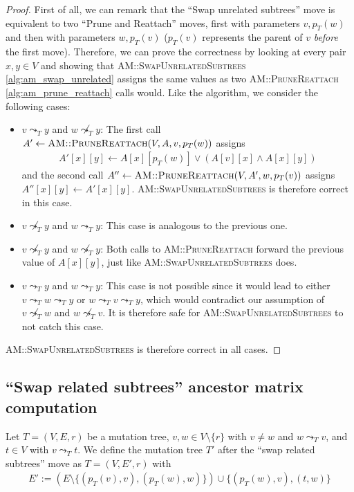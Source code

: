 \begin{proof}
    First of all, we can remark that the ``Swap unrelated subtrees'' move is equivalent to two ``Prune and Reattach'' moves, first with parameters $v, p_T(w)$ and then with parameters $w, p_T(v)$ ($p_T(v)$ represents the parent of $v$ \textit{before} the first move). Therefore, we can prove the correctness by looking at every pair $x,y \in V$ and showing that \textsc{AM::SwapUnrelatedSubtrees} \ref{alg:am_swap_unrelated} assigns the same values as two \textsc{AM::PruneReattach} \ref{alg:am_prune_reattach} calls would. Like the algorithm, we consider the following cases:
    \begin{itemize}
        \item $v \leadsto_T y$ and $w \not\leadsto_T y$: The first call $A' \leftarrow \textsc{AM::PruneReattach}(V, A, v, p_T(w))$ assigns 
        \begin{align*}
            A'[x][y] \leftarrow A[x][p_T(w)] \vee (A[v][x] \wedge A[x][y])
        \end{align*}
        and the second call $A'' \leftarrow \textsc{AM::PruneReattach}(V, A', w, p_T(v))$ assigns $A''[x][y] \leftarrow A'[x][y]$. \textsc{AM::SwapUnrelatedSubtrees} is therefore correct in this case.
        \item $v \not\leadsto_T y$ and $w \leadsto_T y$: This case is analogous to the previous one.
        \item $v \not\leadsto_T y$ and $w \not\leadsto_T y$: Both calls to \textsc{AM::PruneReattach} forward the previous value of $A[x][y]$, just like \textsc{AM::SwapUnrelatedSubtrees} does.
        \item $v \leadsto_T y$ and $w \leadsto_T y$: This case is not possible since it would lead to either $v \leadsto_T w \leadsto_T y$ or $w \leadsto_T v \leadsto_T y$, which would contradict our assumption of $v \not\leadsto_T w$ and $w \not\leadsto_T v$. It is therefore safe for \textsc{AM::SwapUnrelatedSubtrees} to not catch this case.
    \end{itemize}
    \textsc{AM::SwapUnrelatedSubtrees} is therefore correct in all cases.
\end{proof}

\subsection{``Swap related subtrees'' ancestor matrix computation}

\begin{definition}
    \label{def:swap_related_subtrees}
    Let $T = (V, E, r)$ be a mutation tree, $v, w \in V \setminus \{r\}$ with $v \neq w$ and $w \leadsto_T v$, and $t \in V$ with $v \leadsto_T t$. We define the mutation tree $T'$ after the ``swap related subtrees'' move as $T = (V, E', r)$ with
    \begin{align*}
        E' := (E \setminus \{(p_T(v), v), (p_T(w), w)\}) \cup \{(p_T(w), v), (t, w)\}
    \end{align*}
\end{definition}

